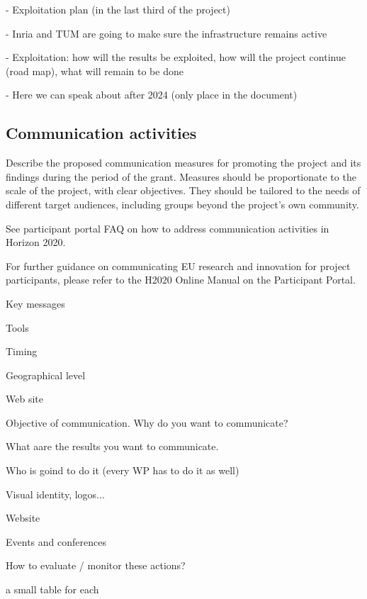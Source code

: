 - Exploitation plan (in the last third of the project)

- Inria and TUM are going to make sure the infrastructure remains active


- Exploitation: how will the results be exploited, how will the project
continue (road map), what will remain to be done

- Here we can speak about after 2024 (only place in the document)

\subsection{Communication activities}


\begin{todo}{}\color{red}
  Describe the proposed communication measures for promoting the project and its findings during the period of the grant. Measures should be proportionate to the scale of the project, with clear objectives.  They should be tailored to the needs of different target audiences, including groups beyond the project's own community.

  See participant portal FAQ on how to address communication activities in Horizon 2020.

  For further guidance on communicating EU research and innovation for project participants, please refer to the H2020 Online Manual on the Participant Portal.
\end{todo}

Key messages

Tools

Timing

Geographical level

Web site

Objective of communication. Why do you want to communicate?

What aare the results you want to communicate.

Who is goind to do it (every WP has to do it as well)

Visual identity, logos...

Website

Events and conferences

How to evaluate / monitor these actions?

{\color{red} a small table for each}


